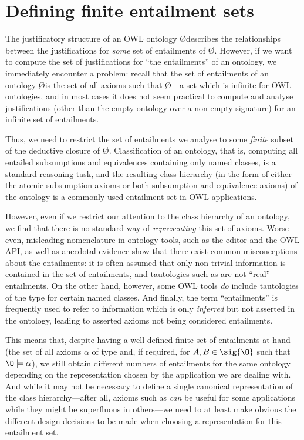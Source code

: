 \chapter{Defining finite entailment sets}
\label{chap:entailments}
The justificatory structure of an OWL ontology \O describes the relationships between the justifications for \emph{some} set of entailments of \O. However, if we want to compute the set of justifications for \enquote{the entailments} of an ontology, we immediately encounter a problem: recall that the set of entailments of an ontology \O is the set of all axioms \axiom such that \O \entails \axiom---a set which is infinite for OWL ontologies, and in most cases it does not seem practical to compute and analyse justifications (other than the empty ontology over a non-empty signature) for an infinite set of entailments. 

Thus, we need to restrict the set of entailments we analyse to some \emph{finite} subset of the deductive closure of \O. Classification of an ontology, that is, computing all entailed subsumptions and equivalences containing only named classes, is a standard reasoning task, and the resulting class hierarchy (in the form of either the atomic subsumption axioms or both subsumption and equivalence axioms) of the ontology is a commonly used entailment set in OWL applications.

However, even if we restrict our attention to the class hierarchy of an ontology, we find that there is no standard way of \emph{representing} this set of axioms. Worse even, misleading nomenclature in ontology tools, such as the \protege editor and the OWL API, as well as anecdotal evidence show that there exist common misconceptions about the entailments: it is often assumed that only non-trivial information is contained in the set of entailments, and tautologies such as  are not \enquote{real} entailments. On the other hand, however, some OWL tools \emph{do} include tautologies of the type  for certain named classes. And finally, the term \enquote{entailments} is frequently used to refer to information which is only \emph{inferred} but not asserted in the ontology, leading to asserted axioms not being considered entailments.

This means that, despite having a well-defined finite set of entailments at hand (the set of all axioms $\alpha$ of type  and, if required,  for $A, B \in \sig{\O}$ such that $\O \models \alpha$), we still obtain different numbers of entailments for the same ontology depending on the representation chosen by the application we are dealing with. And while it may not be necessary to define a single canonical representation of the class hierarchy---after all, axioms such as  \emph{can} be useful for some applications while they might be superfluous in others---we need to at least make obvious the different design decisions to be made when choosing a representation for this entailment set.

